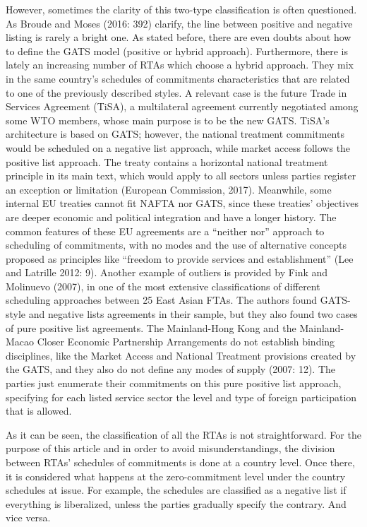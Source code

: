 \documentclass{article}
\begin{document}
However, sometimes the clarity of this two-type classification is often questioned. As Broude and Moses (2016: 392) clarify, the line between positive and negative listing is rarely a bright one. As stated before, there are even doubts about how to define the GATS model (positive or hybrid approach). Furthermore, there is lately an increasing number of RTAs which choose a hybrid approach. They mix in the same country’s schedules of commitments characteristics that are related to one of the previously described styles. A relevant case is the future Trade in Services Agreement (TiSA), a multilateral agreement currently negotiated among some WTO members, whose main purpose is to be the new GATS. TiSA’s architecture is based on GATS; however, the national treatment commitments would be scheduled on a negative list approach, while market access follows the positive list approach. The treaty contains a horizontal national treatment principle in its main text, which would apply to all sectors unless parties register an exception or limitation (European Commission, 2017). Meanwhile, some internal EU treaties cannot fit NAFTA nor GATS, since these treaties’ objectives are deeper economic and political integration and have a longer history. The common features of these EU agreements are a “neither nor” approach to scheduling of commitments, with no modes and the use of alternative concepts proposed as principles like “freedom to provide services and establishment” (Lee and Latrille 2012: 9). Another example of outliers is provided by Fink and Molinuevo (2007), in one of the most extensive classifications of different scheduling approaches between 25 East Asian FTAs. The authors found GATS-style and negative lists agreements in their sample, but they also found two cases of pure positive list agreements. The Mainland-Hong Kong and the Mainland-Macao Closer Economic Partnership Arrangements do not establish binding disciplines, like the Market Access and National Treatment provisions created by the GATS, and they also do not define any modes of supply (2007: 12). The parties just enumerate their commitments on this pure positive list approach, specifying for each listed service sector the level and type of foreign participation that is allowed.

\smallskip

As it can be seen, the classification of all the RTAs is not straightforward. For the purpose of this article and in order to avoid misunderstandings, the division between RTAs’ schedules of commitments is done at a country level. Once there, it is considered what happens at the zero-commitment level under the country schedules at issue. For example, the schedules are classified as a negative list if everything is liberalized, unless the parties gradually specify the contrary. And vice versa.
\end{document}
